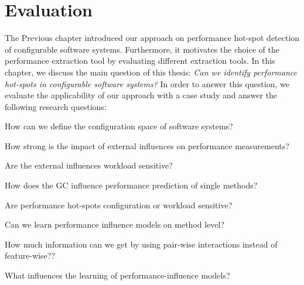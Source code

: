 \chapter{Evaluation}
\label{chap:analysis}

The Previous chapter introduced our approach on performance hot-spot detection of configurable software systems. Furthermore, it motivates the choice of the performance extraction tool by evaluating different extraction tools. In this chapter, we discuss the main question of this thesis: \emph{Can we identify performance hot-spots in configurable software systems?} In order to answer this question, we evaluate the applicability of our approach with a case study and answer the following research questions:


\begin{researchq}
	\item How can we define the configuration space of software systems?
	\label{rq:config_space}

	\item How strong is the impact of external influences on performance measurements?
	\label{rq:external_influence}
	
	\begin{researchq}
		\item Are the external influences workload sensitive?
		\label{rq:ext_inf_sensitivity}
		\item How does the \ac{GC} influence performance prediction of single methods?
	\end{researchq}

	\item Are performance hot-spots configuration or workload sensitive?
	\label{rq:sensitivity}

	\item Can we learn performance influence models on method level?
	\label{rq:perf_infl_model}

	\begin{researchq}
		\item How much information can we get by using pair-wise interactions instead of feature-wise??
		\label{rq:interactions}
		\item What influences the learning of performance-influence models?
		\label{rq:learning influence}
	\end{researchq}

\end{researchq}

% 


